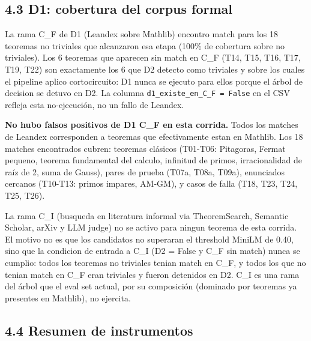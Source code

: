 \documentclass[12pt,a4paper]{article}
\theoremstyle{remark}
\begin{document}
\subsection{4.3 D1: cobertura del corpus formal}

La rama C\_F de D1 (Leandex sobre Mathlib) encontro match para los 18 teoremas no triviales que alcanzaron esa etapa (100\% de cobertura sobre no triviales). Los 6 teoremas que aparecen sin match en C\_F (T14, T15, T16, T17, T19, T22) son exactamente los 6 que D2 detecto como triviales y sobre los cuales el pipeline aplico cortocircuito: D1 nunca se ejecuto para ellos porque el árbol de decision se detuvo en D2. La columna \texttt{d1\_existe\_en\_C\_F = False} en el CSV refleja esta no-ejecución, no un fallo de Leandex.


\textbf{No hubo falsos positivos de D1 C\_F en esta corrida.} Todos los matches de Leandex corresponden a teoremas que efectivamente estan en Mathlib. Los 18 matches encontrados cubren: teoremas clásicos (T01-T06: Pitagoras, Fermat pequeno, teorema fundamental del calculo, infinitud de primos, irracionalidad de raíz de 2, suma de Gauss), pares de prueba (T07a, T08a, T09a), enunciados cercanos (T10-T13: primos impares, AM-GM), y casos de falla (T18, T23, T24, T25, T26).

La rama C\_I (busqueda en literatura informal via TheoremSearch, Semantic Scholar, arXiv y LLM judge) no se activo para ningun teorema de esta corrida. El motivo no es que los candidatos no superaran el threshold MiniLM de 0.40, sino que la condicion de entrada a C\_I (D2 = False y C\_F sin match) nunca se cumplio: todos los teoremas no triviales tenian match en C\_F, y todos los que no tenian match en C\_F eran triviales y fueron detenidos en D2. C\_I es una rama del árbol que el eval set actual, por su composición (dominado por teoremas ya presentes en Mathlib), no ejercita.


\subsection{4.4 Resumen de instrumentos}
\end{document}
